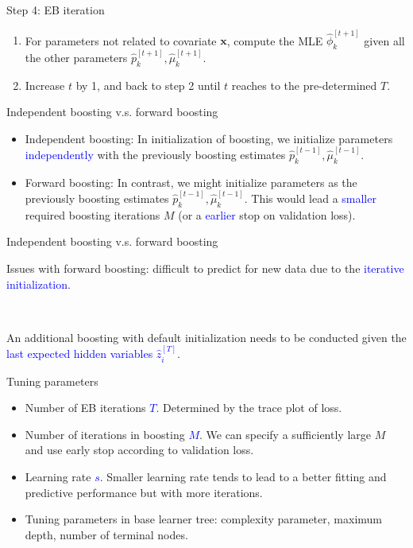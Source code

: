 \documentclass[professionalfont]{beamer}
\def\bx{\boldsymbol{x}}
\newcommand{\blue}[1]{\textcolor{blue}{#1}}
\begin{document}
\begin{frame}{Step 4: EB iteration}
	\begin{enumerate}
		\item For parameters not related to covariate $\bx$, compute the MLE $\hat{\phi}_k^{[t+1]}$ given all the other parameters $\hat{p}_k^{[t+1]}, \hat{\mu}_k^{[t+1]}$.
		\item Increase $t$ by 1, and back to step 2 until $t$
		reaches to the pre-determined $T$.
	\end{enumerate}
\end{frame}

\begin{frame}{Independent boosting v.s. forward boosting}
\begin{itemize}
	\item Independent boosting:
	In initialization of boosting, we initialize parameters \blue{independently} with the previously boosting estimates $\hat{p}_k^{[t-1]}, \hat{\mu}_k^{[t-1]}$.
	\item Forward boosting:
	In contrast, we might initialize parameters as the previously boosting estimates $\hat{p}_k^{[t-1]}, \hat{\mu}_k^{[t-1]}$.
	This would lead a \blue{smaller} required boosting iterations $M$ (or a \blue{earlier} stop on validation loss).
	
	\end{itemize}
\end{frame}

\begin{frame}{Independent boosting v.s. forward boosting}
	
	Issues with forward boosting: difficult to predict for new data due to the \blue{iterative initialization}.
	
	~
	
	An additional boosting with default initialization needs to be conducted given the \blue{last expected hidden variables $\hat{z}_i^{[T]}$}.

\end{frame}

\begin{frame}{Tuning parameters}
	\begin{itemize}
		\item Number of EB iterations \blue{$T$}. Determined by the trace plot of loss.
		\item Number of iterations in boosting \blue{$M$}. We can specify a sufficiently large $M$ and use  early stop according to validation loss.
			\item Learning rate \blue{$s$}. Smaller learning rate tends to lead to a better fitting and predictive performance but with more iterations.
			\item Tuning parameters in base learner tree: complexity parameter, maximum depth, number of terminal nodes.
	\end{itemize}
\end{frame}
\end{document}
